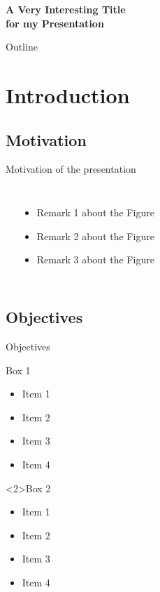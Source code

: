 \documentclass[xcolor=dvipsnames]{beamer}
\begin{document}
\begin{frame}{}{}
  \begin{spacing}{1.0}
    \begin{center}
  \huge \bf \color{rojoUM} A Very Interesting Title \\ for my Presentation
    \end{center}
  \end{spacing}
\end{frame}

\begin{frame}{Outline}
\tableofcontents
\end{frame}  

\section{Introduction}

\subsection{Motivation}

\begin{frame}{Motivation of the presentation}
  \begin{columns}
    \rule{\linewidth}{10em}
    \begin{itemize}
      \item Remark 1 about the Figure
      \item Remark 2 about the Figure
      \item Remark 3 about the Figure
    \end{itemize}
  \end{columns}
\end{frame}

\subsection{Objectives}

\begin{frame}{Objectives}
  \begin{block}{Box 1}
    \begin{itemize}
      \item Item 1 
      \item Item 2 
      \item Item 3 
      \item Item 4 
    \end{itemize}
  \end{block}

  \begin{block}<2>{Box 2}
    \begin{itemize}
      \item Item 1 
      \item Item 2 
      \item Item 3 
      \item Item 4 
    \end{itemize}
  \end{block}
\end{frame}
\end{document}
